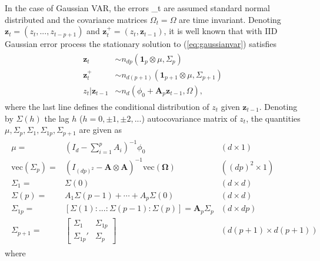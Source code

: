 \documentclass[nojss]{jss} %
\begin{document}
In the case of Gaussian VAR, the errors \varepsilon_t are assumed standard normal distributed and the covariance matrices $\Omega_t=\Omega$ are time invariant. Denoting $\boldsymbol{z}_t=(z_t,...,z_{t-p+1})$ and $\boldsymbol{z}_t^{+}=(z_t,\boldsymbol{z}_{t-1})$, it is well known that with IID Gaussian error process the stationary solution to (\ref{eq:gaussianvar}) satisfies
\begin{align}\label{eq:gausdist}
\begin{aligned}
\boldsymbol{z}_t & \sim n_{dp}(\boldsymbol{1}_p\otimes\mu,\Sigma_{p}) \\
\boldsymbol{z}^{+}_t & \sim n_{d(p+1)}(\boldsymbol{1}_{p+1}\otimes\mu,\Sigma_{p+1}) \\
z_t|\boldsymbol{z}_{t-1} & \sim n_d(\phi_{0} + \boldsymbol{A}_p\boldsymbol{z}_{t-1}, \Omega),
 \end{aligned}
\end{align}
where the last line defines the conditional distribution of $z_t$ given $\boldsymbol{z}_{t-1}$.  Denoting by $\Sigma(h)$ the lag $h$ ($h=0,\pm 1, \pm 2,...$) autocovariance matrix of $z_t$, the quantities $\mu,\Sigma_p,\Sigma_1,\Sigma_{1p},\Sigma_{p+1}$ are given as \cite[see, e.g.,][pp.  23,  28-29]{Lutkepohl:2005}
\begin{align}\label{eq:gausquantities}
\begin{aligned}
\mu = & (I_d - \sum_{i=1}^pA_i)^{-1}\phi_0 & (d\times 1) \\
\text{vec}(\Sigma_p) = & (I_{(dp)^2} - \boldsymbol{A}\otimes\boldsymbol{A})^{-1}\text{vec}(\boldsymbol{\Omega}) & ((dp)^2\times 1)  \\
\Sigma_1 = & \Sigma(0) %
& (d\times d) \\
\Sigma(p) = & A_1\Sigma(p - 1) + \cdots + A_p\Sigma(0) & (d\times d) \\
\Sigma_{1p} = & [\Sigma(1):...:\Sigma(p-1):\Sigma(p)] = \boldsymbol{A}_p\Sigma_p & (d\times dp) \\
\Sigma_{p+1} = &
\begin{bmatrix}
\Sigma_1       & \Sigma_{1p} \\
\Sigma_{1p}' & \Sigma_p
\end{bmatrix}
& (d(p+1) \times d(p+1))
\end{aligned}
\end{align}
where
\end{document}
